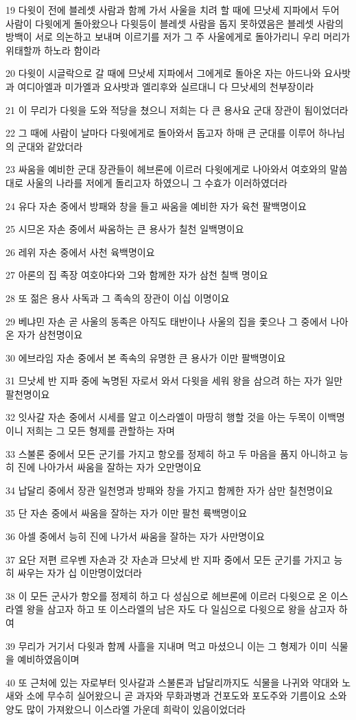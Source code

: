 \par 19 다윗이 전에 블레셋 사람과 함께 가서 사울을 치려 할 때에 므낫세 지파에서 두어 사람이 다윗에게 돌아왔으나 다윗등이 블레셋 사람을 돕지 못하였음은 블레셋 사람의 방백이 서로 의논하고 보내며 이르기를 저가 그 주 사울에게로 돌아가리니 우리 머리가 위태할까 하노라 함이라
\par 20 다윗이 시글락으로 갈 때에 므낫세 지파에서 그에게로 돌아온 자는 아드나와 요사밧과 여디아엘과 미가엘과 요사밧과 엘리후와 실르대니 다 므낫세의 천부장이라
\par 21 이 무리가 다윗을 도와 적당을 쳤으니 저희는 다 큰 용사요 군대 장관이 됨이었더라
\par 22 그 때에 사람이 날마다 다윗에게로 돌아와서 돕고자 하매 큰 군대를 이루어 하나님의 군대와 같았더라
\par 23 싸움을 예비한 군대 장관들이 헤브론에 이르러 다윗에게로 나아와서 여호와의 말씀대로 사울의 나라를 저에게 돌리고자 하였으니 그 수효가 이러하였더라
\par 24 유다 자손 중에서 방패와 창을 들고 싸움을 예비한 자가 육천 팔백명이요
\par 25 시므온 자손 중에서 싸움하는 큰 용사가 칠천 일백명이요
\par 26 레위 자손 중에서 사천 육백명이요
\par 27 아론의 집 족장 여호야다와 그와 함께한 자가 삼천 칠백 명이요
\par 28 또 젊은 용사 사독과 그 족속의 장관이 이십 이명이요
\par 29 베냐민 자손 곧 사울의 동족은 아직도 태반이나 사울의 집을 좇으나 그 중에서 나아온 자가 삼천명이요
\par 30 에브라임 자손 중에서 본 족속의 유명한 큰 용사가 이만 팔백명이요
\par 31 므낫세 반 지파 중에 녹명된 자로서 와서 다윗을 세워 왕을 삼으려 하는 자가 일만 팔천명이요
\par 32 잇사갈 자손 중에서 시세를 알고 이스라엘이 마땅히 행할 것을 아는 두목이 이백명이니 저희는 그 모든 형제를 관할하는 자며
\par 33 스불론 중에서 모든 군기를 가지고 항오를 정제히 하고 두 마음을 품지 아니하고 능히 진에 나아가서 싸움을 잘하는 자가 오만명이요
\par 34 납달리 중에서 장관 일천명과 방패와 창을 가지고 함께한 자가 삼만 칠천명이요
\par 35 단 자손 중에서 싸움을 잘하는 자가 이만 팔천 륙백명이요
\par 36 아셀 중에서 능히 진에 나가서 싸움을 잘하는 자가 사만명이요
\par 37 요단 저편 르우벤 자손과 갓 자손과 므낫세 반 지파 중에서 모든 군기를 가지고 능히 싸우는 자가 십 이만명이었더라
\par 38 이 모든 군사가 항오를 정제히 하고 다 성심으로 헤브론에 이르러 다윗으로 온 이스라엘 왕을 삼고자 하고 또 이스라엘의 남은 자도 다 일심으로 다윗으로 왕을 삼고자 하여
\par 39 무리가 거기서 다윗과 함께 사흘을 지내며 먹고 마셨으니 이는 그 형제가 이미 식물을 예비하였음이며
\par 40 또 근처에 있는 자로부터 잇사갈과 스불론과 납달리까지도 식물을 나귀와 약대와 노새와 소에 무수히 실어왔으니 곧 과자와 무화과병과 건포도와 포도주와 기름이요 소와 양도 많이 가져왔으니 이스라엘 가운데 희락이 있음이었더라

